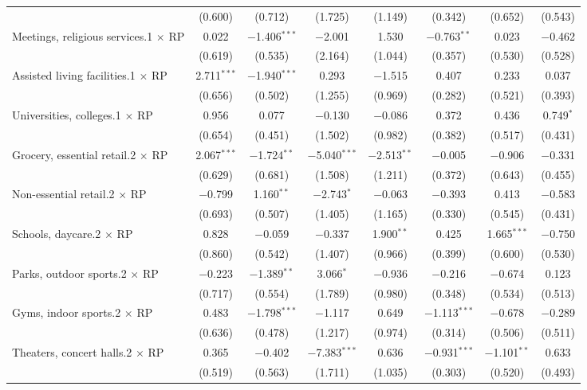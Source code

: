\begin{table}[!htbp]
\begin{tabular}{@{\extracolsep{5pt}}lccccccc}
  & (0.600) & (0.712) & (1.725) & (1.149) & (0.342) & (0.652) & (0.543) \\ 
  Meetings, religious services.1 $\times$ RP & 0.022 & $-$1.406$^{***}$ & $-$2.001 & 1.530 & $-$0.763$^{**}$ & 0.023 & $-$0.462 \\ 
  & (0.619) & (0.535) & (2.164) & (1.044) & (0.357) & (0.530) & (0.528) \\ 
  Assisted living facilities.1 $\times$ RP & 2.711$^{***}$ & $-$1.940$^{***}$ & 0.293 & $-$1.515 & 0.407 & 0.233 & 0.037 \\ 
  & (0.656) & (0.502) & (1.255) & (0.969) & (0.282) & (0.521) & (0.393) \\ 
  Universities, colleges.1 $\times$ RP & 0.956 & 0.077 & $-$0.130 & $-$0.086 & 0.372 & 0.436 & 0.749$^{*}$ \\ 
  & (0.654) & (0.451) & (1.502) & (0.982) & (0.382) & (0.517) & (0.431) \\ 
  Grocery, essential retail.2 $\times$ RP & 2.067$^{***}$ & $-$1.724$^{**}$ & $-$5.040$^{***}$ & $-$2.513$^{**}$ & $-$0.005 & $-$0.906 & $-$0.331 \\ 
  & (0.629) & (0.681) & (1.508) & (1.211) & (0.372) & (0.643) & (0.455) \\ 
  Non-essential retail.2 $\times$ RP & $-$0.799 & 1.160$^{**}$ & $-$2.743$^{*}$ & $-$0.063 & $-$0.393 & 0.413 & $-$0.583 \\ 
  & (0.693) & (0.507) & (1.405) & (1.165) & (0.330) & (0.545) & (0.431) \\ 
  Schools, daycare.2 $\times$ RP & 0.828 & $-$0.059 & $-$0.337 & 1.900$^{**}$ & 0.425 & 1.665$^{***}$ & $-$0.750 \\ 
  & (0.860) & (0.542) & (1.407) & (0.966) & (0.399) & (0.600) & (0.530) \\ 
  Parks, outdoor sports.2 $\times$ RP & $-$0.223 & $-$1.389$^{**}$ & 3.066$^{*}$ & $-$0.936 & $-$0.216 & $-$0.674 & 0.123 \\ 
  & (0.717) & (0.554) & (1.789) & (0.980) & (0.348) & (0.534) & (0.513) \\ 
  Gyms, indoor sports.2 $\times$ RP & 0.483 & $-$1.798$^{***}$ & $-$1.117 & 0.649 & $-$1.113$^{***}$ & $-$0.678 & $-$0.289 \\ 
  & (0.636) & (0.478) & (1.217) & (0.974) & (0.314) & (0.506) & (0.511) \\ 
  Theaters, concert halls.2 $\times$ RP & 0.365 & $-$0.402 & $-$7.383$^{***}$ & 0.636 & $-$0.931$^{***}$ & $-$1.101$^{**}$ & 0.633 \\ 
  & (0.519) & (0.563) & (1.711) & (1.035) & (0.303) & (0.520) & (0.493) \\ 

\end{tabular}
\end{table}
